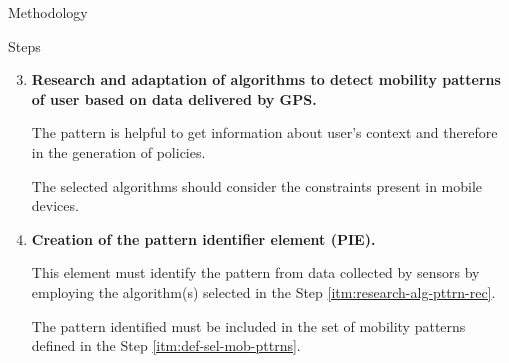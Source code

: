 \begin{frame}{Methodology}
  \small
  \begin{block}{Steps}
    \begin{enumerate}
      \setcounter{enumi}{2}
      \item \label{itm:research-alg-pttrn-rec} \textbf{Research and adaptation of algorithms to detect mobility patterns of user based on data delivered by GPS.}

        
        The pattern is helpful to get information about user's context and therefore in the generation of policies.
        
        The selected algorithms should consider the constraints present in mobile devices.


      \item \textbf{Creation of the pattern identifier element (PIE).}

        This element must identify the pattern from data collected by sensors by employing the algorithm(s) selected in the Step \ref{itm:research-alg-pttrn-rec}.
        
        The pattern identified must be included in the set of mobility patterns defined in the Step \ref{itm:def-sel-mob-pttrns}.


    \end{enumerate}
  \end{block}
\end{frame}

